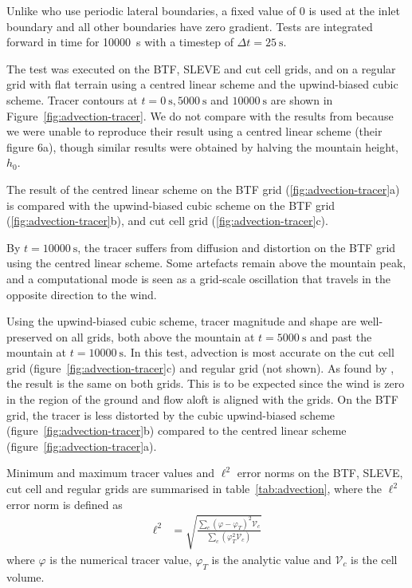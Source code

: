 \documentclass[twocol]{ametsoc}
\begin{document}
Unlike \citet{schaer2002} who use periodic lateral boundaries, a fixed value of 0 is used at the inlet boundary and all other boundaries have zero gradient.
Tests are integrated forward in time for \SI{10000}{\second} with a timestep of \(\Delta t = \SI{25}{\second}\).

The test was executed on the BTF, SLEVE and cut cell grids, and on a regular grid with flat terrain using a centred linear scheme and the upwind-biased cubic scheme.  Tracer contours at \(t = \SI{0}{\second}, \SI{5000}{\second}\) and \(\SI{10000}{\second}\) are shown in Figure~\ref{fig:advection-tracer}.  We do not compare with the results from \citet{schaer2002} because we were unable to reproduce their result using a centred linear scheme (their figure 6a), though similar results were obtained by halving the mountain height, \(h_0\).

The result of the centred linear scheme on the BTF grid (\ref{fig:advection-tracer}a) is compared with the upwind-biased cubic scheme on the BTF grid (\ref{fig:advection-tracer}b), and cut cell grid (\ref{fig:advection-tracer}c).

By \(t = \SI{10000}{\second}\), the tracer suffers from diffusion and distortion on the BTF grid using the centred linear scheme.  Some artefacts remain above the mountain peak, and a computational mode is seen as a grid-scale oscillation that travels in the opposite direction to the wind.

Using the upwind-biased cubic scheme, tracer magnitude and shape are well-preserved on all grids, both above the mountain at \(t = \SI{5000}{\second}\) and past the mountain at \(t = \SI{10000}{\second}\).  In this test, advection is most accurate on the cut cell grid (figure~\ref{fig:advection-tracer}c) and regular grid (not shown).  As found by \citet{good2014}, the result is the same on both grids.  This is to be expected since the wind is zero in the region of the ground and flow aloft is aligned with the grids.  On the BTF grid, the tracer is less distorted by the cubic upwind-biased scheme (figure~\ref{fig:advection-tracer}b) compared to the centred linear scheme (figure~\ref{fig:advection-tracer}a).

Minimum and maximum tracer values and \(\ell^2\) error norms on the BTF, SLEVE, cut cell and regular grids are summarised in table~\ref{tab:advection}, where the \(\ell^2\) error norm is defined as 
\begin{align}
	\ell^2 &= \sqrt{\frac{\sum_c \left( \varphi - \varphi_{T} \right)^2 \mathcal{V}_c}{\sum_c \left( \varphi_T^2 \mathcal{V}_c \right)}}
\end{align}
where $\varphi$ is the numerical tracer value, $\varphi_T$ is the analytic value and $\mathcal{V}_c$ is the cell volume.
\end{document}
